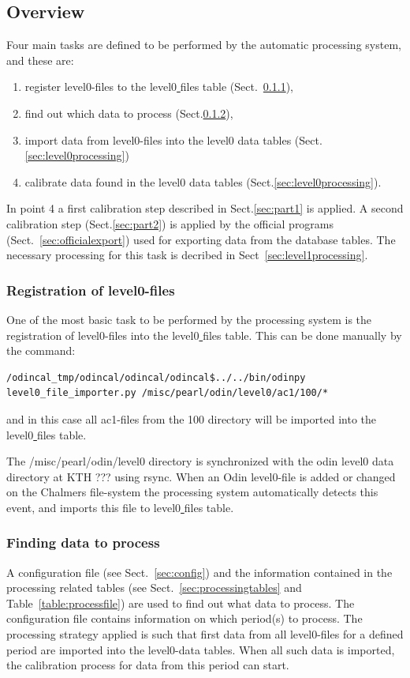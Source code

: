 \documentclass[12pt]{article}
\begin{document}
\subsection{Overview}
Four main tasks are defined to be performed by the 
automatic processing system, 
and these are:
\begin{enumerate}
\item register level0-files to the level0\underline{ }files table
(Sect.~\ref{sec:registration}),
\item find out which data to process (Sect.\ref{sec:findingdata}),
\item import data from level0-files into the level0 data tables
(Sect.\ref{sec:level0processing})
\item calibrate data found in the level0 data tables
(Sect.\ref{sec:level0processing}).
\end{enumerate}

In point 4 a first calibration step described
in Sect.\ref{sec:part1} is applied.
A second calibration step (Sect.\ref{sec:part2}) is applied
by the official programs (Sect.~\ref{sec:officialexport})
used for exporting data from the database tables.
The necessary processing for this task is decribed 
in Sect~\ref{sec:level1processing}.


\subsubsection{Registration of level0-files}
\label{sec:registration}
One of the most basic task to be performed by the processing system is the
registration of level0-files into the level0\underline{ }files table.
This can be done manually by the command:
\begin{verbatim}
/odincal_tmp/odincal/odincal/odincal$../../bin/odinpy 
level0_file_importer.py /misc/pearl/odin/level0/ac1/100/*
\end{verbatim}
and in this case all ac1-files from the 100 directory will be imported
into the level0\underline{ }files table. 

The /misc/pearl/odin/level0 directory
is synchronized with the odin level0 data directory at KTH ??? using rsync. 
When an Odin level0-file is added or changed on the Chalmers file-system
the processing system automatically detects this event, and imports this
file to level0\underline{ }files table.


\subsubsection{Finding data to process}
\label{sec:findingdata}
A configuration file (see Sect.~\ref{sec:config})
and the information contained 
in the processing related tables (see Sect.~\ref{sec:processingtables}
and Table~\ref{table:processfile}) 
are used to find out what data to process. 
The configuration file contains information on which period(s)
to process. The processing strategy applied is such that
first data from all level0-files for a defined period
are imported into the level0-data tables.
When all such data is imported, the calibration process
for data from this period can start.
\end{document}
